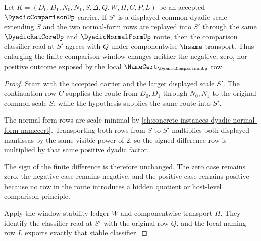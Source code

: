\begin{theorem}
\label{thm:dyadic-comparison-window-stability}
Let $K=(D_0,D_1,N_0,N_1,S,\Delta,Q,W,H,C,P,L)$ be an accepted $\DyadicComparisonUp$ carrier. If $S'$ is a displayed common dyadic scale extending $S$ and the two normal-form rows are replayed into $S'$ through the same $\DyadicRatCoreUp$ and $\DyadicNormalFormUp$ route, then the comparison classifier read at $S'$ agrees with $Q$ under componentwise $\hsame$ transport. Thus enlarging the finite comparison window changes neither the negative, zero, nor positive outcome exposed by the local $\NameCert_{\DyadicComparisonUp}$ row.
\end{theorem}
\begin{proof}
Start with the accepted carrier and the larger displayed scale $S'$. The continuation row $C$ supplies the route from $D_0,D_1$ through $N_0,N_1$ to the original common scale $S$, while the hypothesis supplies the same route into $S'$.

The normal-form rows are scale-minimal by \autoref{ch:concrete-instances-dyadic-normal-form-namecert}. Transporting both rows from $S$ to $S'$ multiplies both displayed mantissas by the same visible power of $2$, so the signed difference row is multiplied by that same positive dyadic factor.

The sign of the finite difference is therefore unchanged. The zero case remains zero, the negative case remains negative, and the positive case remains positive because no row in the route introduces a hidden quotient or host-level comparison principle.

Apply the window-stability ledger $W$ and componentwise transport $H$. They identify the classifier read at $S'$ with the original row $Q$, and the local naming row $L$ exports exactly that stable classifier.
\end{proof}

